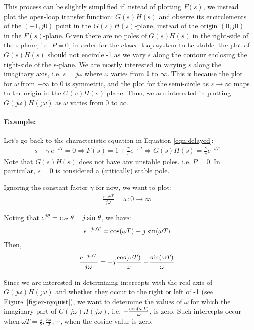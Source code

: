 \documentclass{article}
\def\sn{{\rm sin}}
\def\cs{{\rm cos}}
\begin{document}
This process can be slightly simplified if instead of plotting $F(s)$,
we instead plot the open-loop transfer function: $G(s)H(s)$ and 
observe its encirclements of the $(-1, j 0)$ point in the $G(s)H(s)$-plane,
instead of  the origin $(0, j 0)$ in the $F(s)$-plane.
Given there are no poles of $G(s)H(s)$ in the right-side of the s-plane, i.e. $P=0$,
in order for the closed-loop system to be stable,
the plot of  $G(s)H(s)$ should not encircle -1 as we vary $s$ along the contour enclosing
the right-side of the s-plane.
We are mostly interested in varying $s$ along the imaginary axis,
i.e. $s = j \omega$ where $\omega$ varies from 0 to $\infty$.
This is because the plot for $\omega$ from $- \infty$ to 0 is symmetric,
and the plot for the semi-circle as $s \rightarrow \infty$ maps to the origin in the $G(s)H(s)$-plane.
Thus, we are interested in plotting $G(j \omega) H(j \omega)$
as $\omega$ varies from 0 to $\infty$.

\paragraph{Example:}
Let's go back to the characteristic equation in Equation \ref{eqn:delayed}:
\begin{eqnarray*}
s + \gamma\ e^{-sT} = 0  \Rightarrow F(s) = 1 + \frac{\gamma}{s} e^{-sT} \Rightarrow G(s)H(s) = \frac{\gamma}{s} e^{-sT}
\end{eqnarray*}
Note that $G(s)H(s)$ does not have any unstable poles, i.e. $P=0$. 
In particular, $s=0$ is considered a (critically) stable pole.

Ignoring the constant factor $\gamma$ for now, we want to plot:
\begin{eqnarray*}
\frac{e^{-j \omega T}}{j \omega} \ \ \ \ \ \  \omega: 0 \rightarrow \infty
\end{eqnarray*}

Noting that $e^{j \theta} = \cs \; \theta + j\; \sn \; \theta$, we have:
\begin{eqnarray*}
e^{-j \omega T} = \cs(\omega T) - j\; \sn(\omega T) 
\end{eqnarray*}
Then,
\begin{eqnarray*}
\frac{e^{-j \omega T}}{j \omega} = - j \frac{\cs(\omega T)}{\omega} - \frac{\sn(\omega T)}{\omega} 
\end{eqnarray*}

Since we are interested in determining intercepts with the real-axis of $G(j \omega) H(j \omega)$
and whether they occur to the right or left of -1 (see Figure~\ref{fig:ex-nyquist}),
we want to determine the values of $\omega$ 
for which the imaginary part of $G(j \omega) H(j \omega)$, i.e. $- \frac{\cs(\omega T)}{\omega}$, is zero.
Such intercepts occur when $\omega T = \frac{\pi}{2}, \frac{3 \pi}{2}, \cdots$, when the cosine value is zero.
\end{document}
